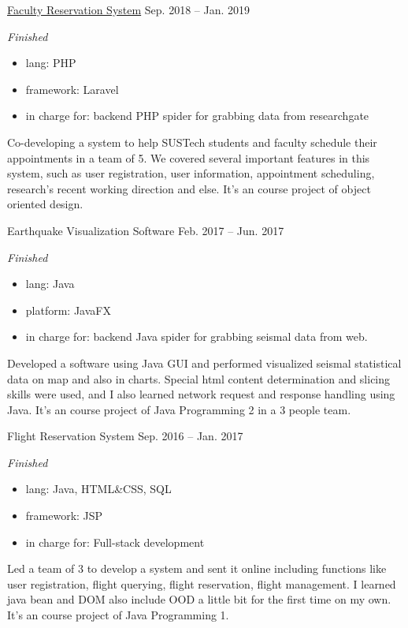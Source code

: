 \documentclass[hidelinks__VERSION__]{adamyi-cv}
\begin{document}
\begin{entrylist}

\entry
{\href{https://github.com/zhaoweizhong/Faculty-Reservation}{Faculty Reservation System}}
{Sep. 2018 -- Jan. 2019}
{\emph{Finished}
\begin{itemize}
    \item lang: PHP
    \item framework: Laravel
    \item in charge for: backend PHP spider for grabbing data from researchgate
\end{itemize}
Co-developing a system to help SUSTech students and faculty schedule their appointments in a team of 5. We covered several important features in this system, such as user registration, user information, appointment scheduling, research's recent working direction and else. It's an course project of object oriented design.
}



\entry
{Earthquake Visualization Software}
{Feb. 2017 -- Jun. 2017}
{\emph{Finished}
\begin{itemize}
    \item lang: Java
    \item platform: JavaFX
    \item in charge for: backend Java spider for grabbing seismal data from web.
\end{itemize}
Developed a software using Java GUI and performed visualized seismal statistical data on map and also in charts. Special html content determination and slicing skills were used, and I also learned network request and response handling using Java. It's an course project of Java Programming 2 in a 3 people team.
}


\entry
{Flight Reservation System}
{Sep. 2016 -- Jan. 2017}
{\emph{Finished}
\begin{itemize}
    \item lang: Java, HTML\&CSS, SQL
    \item framework: JSP
    \item in charge for: Full-stack development
\end{itemize}
Led a team of 3 to develop a system and sent it online including functions like user registration, flight querying, flight reservation, flight management. I learned java bean and DOM also include OOD a little bit for the first time on my own. It's an course project of Java Programming 1.
}


\end{entrylist}
\end{document}
